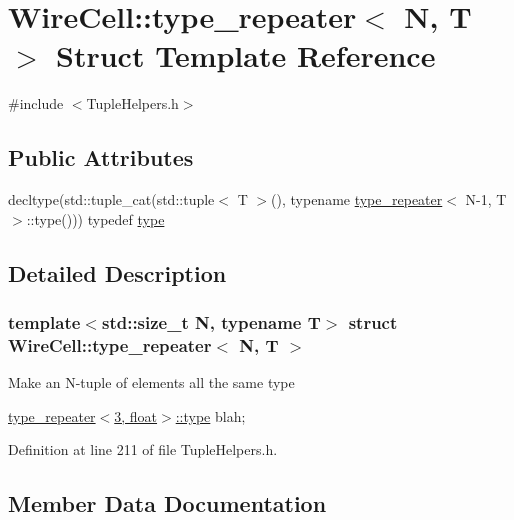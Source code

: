 \hypertarget{struct_wire_cell_1_1type__repeater}{}\section{Wire\+Cell\+:\+:type\+\_\+repeater$<$ N, T $>$ Struct Template Reference}
\label{struct_wire_cell_1_1type__repeater}


{\ttfamily \#include $<$Tuple\+Helpers.\+h$>$}

\subsection*{Public Attributes}
\begin{DoxyCompactItemize}
\item 
decltype(std\+::tuple\+\_\+cat(std\+::tuple$<$ T $>$(), typename \hyperlink{struct_wire_cell_1_1type__repeater}{type\+\_\+repeater}$<$ N-\/1, T $>$\+::type())) typedef \hyperlink{struct_wire_cell_1_1type__repeater_a27e44c370a737feb9e3b5799acc97a4f}{type}
\end{DoxyCompactItemize}


\subsection{Detailed Description}
\subsubsection*{template$<$std\+::size\+\_\+t N, typename T$>$\newline
struct Wire\+Cell\+::type\+\_\+repeater$<$ N, T $>$}

Make an N-\/tuple of elements all the same type

\hyperlink{struct_wire_cell_1_1type__repeater_a27e44c370a737feb9e3b5799acc97a4f}{type\+\_\+repeater$<$3, float$>$\+::type} blah; 

Definition at line 211 of file Tuple\+Helpers.\+h.



\subsection{Member Data Documentation}
\mbox{\label{struct_wire_cell_1_1type__repeater_a27e44c370a737feb9e3b5799acc97a4f}} 

